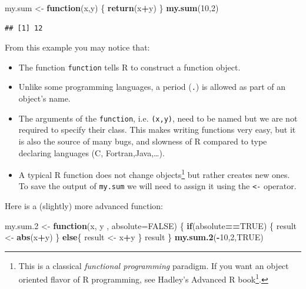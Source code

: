 \documentclass[]{book}
\newenvironment{Shaded}{\begin{snugshade}}{\end{snugshade}}
\newcommand{\ControlFlowTok}[1]{\textcolor[rgb]{0.13,0.29,0.53}{\textbf{#1}}}
\newcommand{\DataTypeTok}[1]{\textcolor[rgb]{0.13,0.29,0.53}{#1}}
\newcommand{\DecValTok}[1]{\textcolor[rgb]{0.00,0.00,0.81}{#1}}
\newcommand{\FloatTok}[1]{\textcolor[rgb]{0.00,0.00,0.81}{#1}}
\newcommand{\KeywordTok}[1]{\textcolor[rgb]{0.13,0.29,0.53}{\textbf{#1}}}
\newcommand{\NormalTok}[1]{#1}
\newcommand{\OperatorTok}[1]{\textcolor[rgb]{0.81,0.36,0.00}{\textbf{#1}}}
\newcommand{\OtherTok}[1]{\textcolor[rgb]{0.56,0.35,0.01}{#1}}
\newcommand{\StringTok}[1]{\textcolor[rgb]{0.31,0.60,0.02}{#1}}
\renewcommand{\href}[2]{#2\footnote{\url{#1}}}
\theoremstyle{definition}
\theoremstyle{definition}
\theoremstyle{definition}
\theoremstyle{remark}
\begin{document}
\begin{Shaded}
\begin{Highlighting}[]
\NormalTok{my.sum <-}\StringTok{ }\ControlFlowTok{function}\NormalTok{(x,y) \{}
  \KeywordTok{return}\NormalTok{(x}\OperatorTok{+}\NormalTok{y)}
\NormalTok{\}}
\KeywordTok{my.sum}\NormalTok{(}\DecValTok{10}\NormalTok{,}\DecValTok{2}\NormalTok{)}
\end{Highlighting}
\end{Shaded}

\begin{verbatim}
## [1] 12
\end{verbatim}

From this example you may notice that:

\begin{itemize}
\item
  The function \texttt{function} tells R to construct a function object.
\item
  Unlike some programming languages, a period (\texttt{.}) is allowed as part of an object's name.
\item
  The arguments of the \texttt{function}, i.e. \texttt{(x,y)}, need to be named but we are not required to specify their class. This makes writing functions very easy, but it is also the source of many bugs, and slowness of R compared to type declaring languages (C, Fortran,Java,\ldots{}).
\item
  A typical R function does not change objects\footnote{This is a classical \emph{functional programming} paradigm. If you want an object oriented flavor of R programming, see Hadley's \href{http://adv-r.had.co.nz/OO-essentials.html}{Advanced R book}.} but rather creates new ones.
  To save the output of \texttt{my.sum} we will need to assign it using the \texttt{\textless{}-} operator.
\end{itemize}

Here is a (slightly) more advanced function:

\begin{Shaded}
\begin{Highlighting}[]
\NormalTok{my.sum}\FloatTok{.2}\NormalTok{ <-}\StringTok{ }\ControlFlowTok{function}\NormalTok{(x, y , }\DataTypeTok{absolute=}\OtherTok{FALSE}\NormalTok{) \{}
  \ControlFlowTok{if}\NormalTok{(absolute}\OperatorTok{==}\OtherTok{TRUE}\NormalTok{) \{}
\NormalTok{    result <-}\StringTok{ }\KeywordTok{abs}\NormalTok{(x}\OperatorTok{+}\NormalTok{y)}
\NormalTok{  \}}
  \ControlFlowTok{else}\NormalTok{\{}
\NormalTok{    result <-}\StringTok{ }\NormalTok{x}\OperatorTok{+}\NormalTok{y}
\NormalTok{  \} }
\NormalTok{  result}
\NormalTok{\}}
\KeywordTok{my.sum.2}\NormalTok{(}\OperatorTok{-}\DecValTok{10}\NormalTok{,}\DecValTok{2}\NormalTok{,}\OtherTok{TRUE}\NormalTok{)}
\end{Highlighting}
\end{Shaded}
\end{document}
